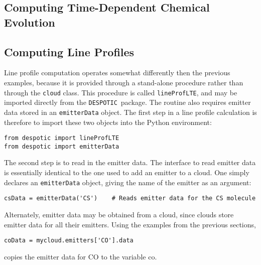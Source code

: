 \documentclass[12pt]{article}
\newcommand{\despotic}{\texttt{DESPOTIC}}
\begin{document}
\subsection{Computing Time-Dependent Chemical Evolution}


\subsection{Computing Line Profiles}

Line profile computation operates somewhat differently then the previous examples, because it is provided through a stand-alone procedure rather than through the \verb=cloud= class. This procedure is called \verb=lineProfLTE=, and may be imported directly from the \despotic\ package. The routine also requires emitter data stored in an \verb=emitterData= object. The first step in a line profile calculation is therefore to import these two objects into the Python environment:
\begin{verbatim}
from despotic import lineProfLTE
from despotic import emitterData
\end{verbatim}

The second step is to read in the emitter data. The interface to read emitter data is essentially identical to the one used to add an emitter to a cloud. One simply declares an \verb=emitterData= object, giving the name of the emitter as an argument:
\begin{verbatim}
csData = emitterData('CS')    # Reads emitter data for the CS molecule
\end{verbatim}
Alternately, emitter data may be obtained from a cloud, since clouds store emitter data for all their emitters. Using the examples from the previous sections,
\begin{verbatim}
coData = mycloud.emitters['CO'].data
\end{verbatim}
copies the emitter data for CO to the variable co.
\end{document}
